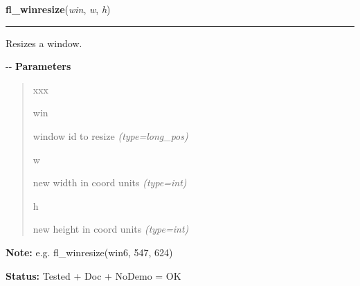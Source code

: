 \hspace{.8\funcindent}\begin{boxedminipage}{\funcwidth}

    \raggedright \textbf{fl\_winresize}(\textit{win}, \textit{w}, \textit{h})

    \vspace{-1.5ex}

    \rule{\textwidth}{0.5\fboxrule}
\setlength{\parskip}{2ex}

Resizes a window.

-{}-
\setlength{\parskip}{1ex}
      \textbf{Parameters}
      \vspace{-1ex}

      \begin{quote}
        \begin{Ventry}{xxx}

          \item[win]


window id to resize
            {\it (type=long\_pos)}

          \item[w]


new width in coord units
            {\it (type=int)}

          \item[h]


new height in coord units
            {\it (type=int)}

        \end{Ventry}

      \end{quote}

\textbf{Note:} 
e.g. fl\_winresize(win6, 547, 624)


\textbf{Status:} 
Tested + Doc + NoDemo = OK


    \end{boxedminipage}

    \label{xformslib:flxbasic:fl_winmove}

    \vspace{0.5ex}

